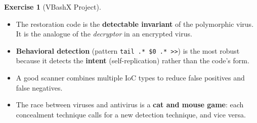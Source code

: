\documentclass[a4paper,11pt]{article}
\theoremstyle{plain}
\theoremstyle{definition}
\newtheorem{exercice}{Exercise}
\begin{document}
\begin{exercice}[VBashX Project]
\begin{correction}
\begin{pointcle}
\begin{itemize}
    \item The restoration code is the \textbf{detectable invariant} of the polymorphic virus. It is the analogue of the \textit{decryptor} in an encrypted virus.
    \item \textbf{Behavioral detection} (pattern \texttt{tail .* \$0 .* >>}) is the most robust because it detects the \textbf{intent} (self-replication) rather than the code's form.
    \item A good scanner combines multiple IoC types to reduce false positives and false negatives.
    \item The race between viruses and antivirus is a \textbf{cat and mouse game}: each concealment technique calls for a new detection technique, and vice versa.
\end{itemize}
\end{pointcle}

\end{correction}

\end{exercice}
\end{document}
